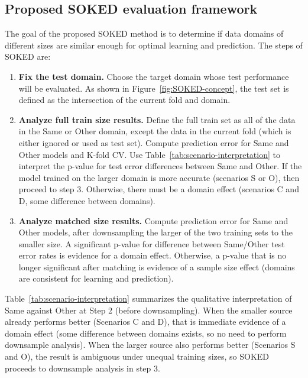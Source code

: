 \documentclass[twoside]{article}
\begin{document}
\subsection{Proposed SOKED evaluation framework}
\label{sec:workflow}
The goal of the proposed SOKED method is to determine if data domains of different sizes are similar enough for optimal learning and prediction.
The steps of SOKED are:
\begin{enumerate}
    \item \textbf{Fix the test domain.} Choose the target domain whose test performance will be evaluated.
    As shown in Figure~\ref{fig:SOKED-concept}, the test set is defined as the intersection of the current fold and domain.
    \item \textbf{Analyze full train size results.}
    Define the full train set as all of the data in the Same or Other domain, except the data in the current fold (which is either ignored or used as test set).
    Compute prediction error for Same and Other models and K-fold CV.
    Use Table~\ref{tab:scenario-interpretation} to interpret the p-value for test error differences between Same and Other.
    If the model trained on the larger domain is more accurate (scenarios S or O), then proceed to step 3.
    Otherwise, there must be a domain effect (scenarios C and D, some difference between domains).
    \item \textbf{Analyze matched size results.}
    Compute prediction error for Same and Other models, after downsampling the larger of the two training sets to the smaller size.
    A significant p-value for difference between Same/Other test error rates is evidence for a domain effect.
    Otherwise, a p-value that is no longer significant after matching is evidence of a sample size effect (domains are consistent for learning and prediction).
\end{enumerate}
Table~\ref{tab:scenario-interpretation} summarizes the qualitative interpretation of Same against Other at Step 2 (before downsampling).
When the smaller source already performs better (Scenarios C and D), that is immediate evidence of a domain effect (some difference between domains exists, so no need to perform downsample analysis).
When the larger source also performs better (Scenarios S and O), the result is ambiguous under unequal training sizes, so SOKED proceeds to downsample analysis in step 3.
\end{document}
